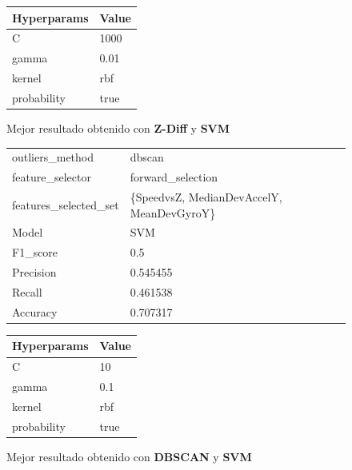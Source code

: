 \begin{appendices}
\begin{figure}[htb]
			\begin{tabular}{ll}
				\toprule
				Hyperparams & Value \\
				\midrule
						  C &  1000 \\
					  gamma &  0.01 \\
					 kernel &   rbf \\
				probability &  true \\
				\bottomrule
			\end{tabular}
			\caption{Mejor resultado obtenido con \textbf{Z-Diff} y \textbf{SVM}}
			\label{table:26}
		\end{figure}

		\begin{figure}[htb]
			\centering
			\begin{tabular}{ll}
				\toprule
					  outliers\_method &                                    dbscan \\
					 feature\_selector &                         forward\_selection \\
				features\_selected\_set & \{SpeedvsZ, MedianDevAccelY, MeanDevGyroY\} \\
								Model &                                       SVM \\
						F1\_score &                                       0.5 \\
					   Precision &                                  0.545455 \\
						  Recall &                                  0.461538 \\
						Accuracy &                                  0.707317 \\
				\bottomrule
			\end{tabular}
			\newline
			\newline

			\begin{tabular}{ll}
				\toprule
				Hyperparams & Value \\
				\midrule
						  C &    10 \\
					  gamma &   0.1 \\
					 kernel &   rbf \\
				probability &  true \\
				\bottomrule
			\end{tabular}
			\caption{Mejor resultado obtenido con \textbf{DBSCAN} y \textbf{SVM}}
			\label{table:27}
		\end{figure}


\end{appendices}
